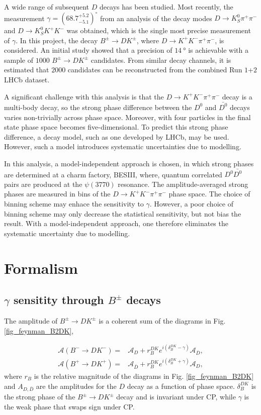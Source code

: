 \documentclass[12pt, a4paper, notitlepage, onecolumn]{article}
\numberwithin{equation}{section}
\begin{document}
A wide range of subsequent $D$ decays has been studied. Most recently, the measurement $\gamma = (68.7^{+5.2}_{-5.1})^\circ$ from an analysis of the decay modes $D\to K_S^0\pi^+\pi^-$ and $D\to K_S^0K^+K^-$ was obtained, which is the single most precise measurement of $\gamma$. In this project, the decay $B^\pm\to DK^\pm$, where $D\to K^+K^-\pi^+\pi^-$, is considered. An initial study showed that a precision of $\SI{14}{\degree}$ is achievable with a sample of $1000$ $B^\pm\to DK^\pm$ candidates. From similar decay channels, it is estimated that $2000$ candidates can be reconstructed from the combined Run $1$+$2$ LHCb dataset.

A significant challenge with this analysis is that the $D\to K^+K^-\pi^+\pi^-$ decay is a multi-body decay, so the strong phase difference between the $D^0$ and $\bar{D^0}$ decays varies non-trivially across phase space. Moreover, with four particles in the final state phase space becomes five-dimensional. To predict this strong phase difference, a decay model, such as one developed by LHCb, may be used. However, such a model introduces systematic uncertainties due to modelling.

In this analysis, a model-independent approach is chosen, in which strong phases are determined at a charm factory, BESIII, where, quantum correlated $D^0\bar{D^0}$ pairs are produced at the $\psi(3770)$ resonance. The amplitude-averaged strong phases are measured in bins of the $D\to K^+K^-\pi^+\pi^-$ phase space. The choice of binning scheme may enhace the sensitivity to $\gamma$. However, a poor choice of binning scheme may only decrease the statistical sensitivity, but not bias the result. With a model-independent approach, one therefore eliminates the systematic uncertainty due to modelling.

\section{Formalism}
\subsection{\texorpdfstring{$\gamma$}{gamma} sensitity through \texorpdfstring{$B^\pm$}{B} decays}
The amplitude of $B^\pm\to DK^\pm$ is a coherent sum of the diagrams in Fig. \ref{fig_feynman_B2DK},

\begin{align}
  \mathcal{A}(B^-\to DK^-) =& \mathcal{A}_D + r_B^{DK}e^{i(\delta_B^{DK} - \gamma)}\mathcal{A}_{\bar{D}}, \label{eq_Bm2DKm} \\
  \mathcal{A}(B^+\to DK^+) =& \mathcal{A}_{\bar{D}} + r_B^{DK}e^{i(\delta_B^{DK} + \gamma)}\mathcal{A}_D, \label{eq_Bp2DKp}
\end{align}
where $r_B$ is the relative magnitude of the diagrams in Fig. \ref{fig_feynman_B2DK} and $A_{D, \bar{D}}$ are the amplitudes for the $D$ decay as a function of phase space. $\delta_B^{DK}$ is the strong phase of the $B^\pm\to DK^\pm$ decay and is invariant under CP, while $\gamma$ is the weak phase that swaps sign under CP.
\end{document}
